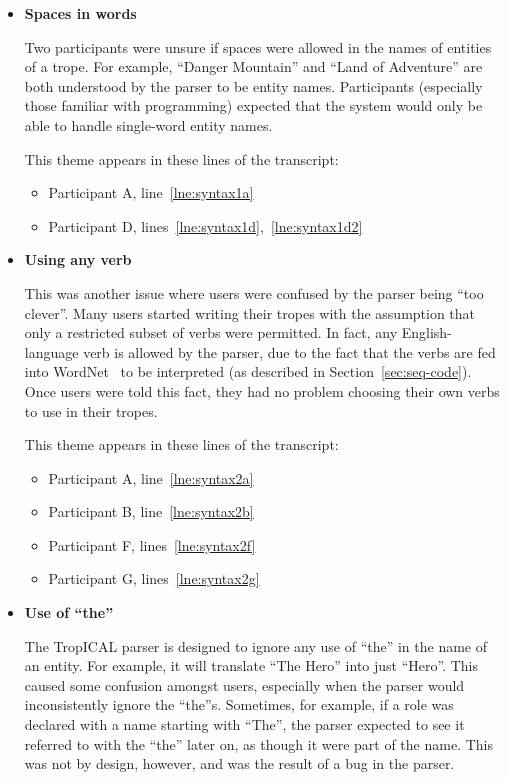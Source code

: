 \documentclass[11pt]{report}
\newcommand{\lref}[1]{\hyperlink{llineno:#1}{\ref*{#1}}}
\begin{document}
\begin{itemize}
\item \textbf{Spaces in words}

Two participants were unsure if spaces were allowed in the names of entities of
a trope. For example, ``Danger Mountain'' and ``Land of Adventure'' are both
understood by the parser to be entity names. Participants (especially those
familiar with programming) expected that the system would only be able to handle
single-word entity names.

This theme appears in these lines of the transcript:

\begin{itemize}
\item Participant A, line~\lref{lne:syntax1a}
\item Participant D, lines~\lref{lne:syntax1d},~\lref{lne:syntax1d2}
\end{itemize}

\item \textbf{Using any verb}

This was another issue where users were confused by the parser being ``too
clever''. Many users started writing their tropes with the assumption that only
a restricted subset of verbs were permitted. In fact, any English-language verb
is allowed by the parser, due to the fact that the verbs are fed into WordNet~\citep{miller1995wordnet} to
be interpreted (as described in Section~\ref{sec:seq-code}). Once users were told this fact, they had no problem choosing
their own verbs to use in their tropes.

This theme appears in these lines of the transcript:

\begin{itemize}
\item Participant A, line~\lref{lne:syntax2a}
\item Participant B, line~\lref{lne:syntax2b}
\item Participant F, lines~\lref{lne:syntax2f}
\item Participant G, lines~\lref{lne:syntax2g}
\end{itemize}

\item \textbf{Use of ``the''}

The TropICAL parser is designed to ignore any use of ``the'' in the name of an
entity. For example, it will translate ``The Hero'' into just ``Hero''. This
caused some confusion amongst users, especially when the parser would
inconsistently ignore the ``the''s. Sometimes, for example, if a role was
declared with a name starting with ``The'', the parser expected to see it
referred to with the ``the'' later on, as though it were part of the name. This
was not by design, however, and was the result of a bug in the parser.


\end{itemize}
\end{document}
